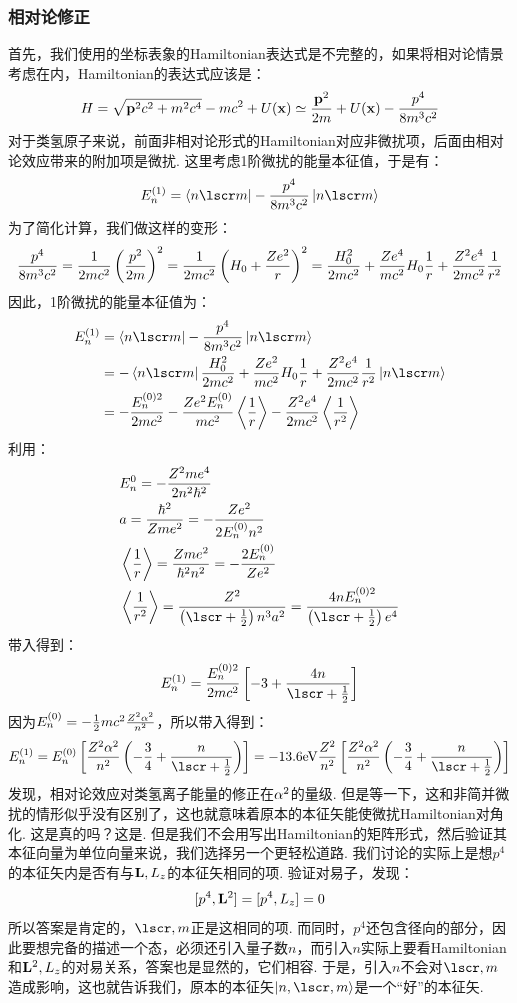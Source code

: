 \subsubsection{相对论修正}
首先，我们使用的坐标表象的Hamiltonian表达式是不完整的，如果将相对论情景考虑在内，Hamiltonian的表达式应该是：
\[
H = \sqrt{\mathbf{p}^{2}c^{2} + m^{2}c^{4}} - mc^{2}  + U(\mathbf{x}) \simeq \frac{\mathbf{p}^2}{2m} + U(\mathbf{x}) - \frac{p^{4}}{8m^{3}c^{2}}
\]
对于类氢原子来说，前面非相对论形式的Hamiltonian对应非微扰项，后面由相对论效应带来的附加项是微扰. 这里考虑1阶微扰的能量本征值，于是有：
\[
E_{n}^{(1)} = \bra{n\lscr m}- \frac{p^{4}}{8m^{3}c^{2}}\ket{n\lscr m}
\]
为了简化计算，我们做这样的变形：
\[
\frac{p^{4}}{8m^{3}c^{2}} = \frac{1}{2mc^{2}}\left({\frac{p^{2}}{2m}}\right)^{2} = \frac{1}{2mc^{2}}\left({H_{0} + \frac{Ze^{2}}{r}}\right)^{2} = \frac{H_{0}^{2}}{2mc^{2}} + \frac{Ze^{4}}{mc^{2}}H_{0}\frac{1}{r} + \frac{Z^{2}e^{4}}{2mc^{2}}\frac{1}{r^{2}}
\]
因此，1阶微扰的能量本征值为：
\begin{align*}
E_{n}^{(1)}
& = \bra{n\lscr m}- \frac{p^{4}}{8m^{3}c^{2}}\ket{n\lscr m} \\
& = -\bra{n\lscr m}\frac{H_{0}^{2}}{2mc^{2}} + \frac{Ze^{2}}{mc^{2}}H_{0}\frac{1}{r} + \frac{Z^{2}e^{4}}{2mc^{2}}\frac{1}{r^{2}}\ket{n\lscr m} \\
& = - \frac{E_{n}^{(0)2}}{2mc^{2}} - \frac{Ze^{2}E_{n}^{(0)}}{mc^{2}}\avg{\frac{1}{r}} - \frac{Z^{2}e^{4}}{2mc^{2}}\avg{\frac{1}{r^{2}}} \\
\end{align*}
利用：
\begin{align*}
& E_{n}^{0} = -\frac{Z^{2}me^{4}}{2n^{2}\hh^{2}} \\
& a = \frac{\hh^{2}}{Zme^{2}} = -\frac{Ze^{2}}{2E_{n}^{(0)}n^{2}} \\
& \avg{\frac{1}{r}} = \frac{Zme^{2}}{\hh^{2}n^{2}} = -\frac{2E_{n}^{(0)}}{Ze^{2}} \\
& \avg{\frac{1}{r^{2}}}= \frac{Z^{2}}{\br{\lscr+\frac{1}{2}}n^{3}a^{2}} = \frac{4nE_{n}^{(0)2}}{\br{\lscr+\frac{1}{2}}e^{4}} \\
\end{align*}
带入得到：
\[
E_{n}^{(1)} = \frac{E_{n}^{(0)2}}{2mc^{2}}\mbr{-3 + \frac{4n}{\lscr+\frac{1}{2}}}
\]
因为\(E_{n}^{(0)} = -\frac{1}{2}mc^{2}\frac{Z^{2}\alpha^{2}}{n^{2}}\)，所以带入得到：
\[
E_{n}^{(1)} = E_{n}^{(0)}\mbr{\frac{Z^{2}\al^{2}}{n^{2}}\br{-\frac{3}{4} + \frac{n}{\lscr+\frac{1}{2}}}} = -13.6\mathrm{eV}\frac{Z^{2}}{n^{2}}\mbr{\frac{Z^{2}\al^{2}}{n^{2}}\br{-\frac{3}{4} + \frac{n}{\lscr+\frac{1}{2}}}}
\]
发现，相对论效应对类氢离子能量的修正在\(\alpha^{2}\)的量级. 但是等一下，这和非简并微扰的情形似乎没有区别了，这也就意味着原本的本征矢能使微扰Hamiltonian对角化. 这是真的吗？这是. 但是我们不会用写出Hamiltonian的矩阵形式，然后验证其本征向量为单位向量来说，我们选择另一个更轻松道路. 我们讨论的实际上是想\(p^{4}\)的本征矢内是否有与\(\mathbf{L},L_{z}\)的本征矢相同的项. 验证对易子，发现：
\[
[p^{4},\mathbf{L}^{2}] = [p^{4},L_{z}] = 0
\]
所以答案是肯定的，\(\lscr,m\)正是这相同的项. 而同时，\(p^{4}\)还包含径向的部分，因此要想完备的描述一个态，必须还引入量子数\(n\)，而引入\(n\)实际上要看Hamiltonian和\(\mathbf{L}^{2},L_{z}\)的对易关系，答案也是显然的，它们相容. 于是，引入\(n\)不会对\(\lscr,m\)造成影响，这也就告诉我们，原本的本征矢\(\ket{n,\lscr,m}\)是一个“好”的本征矢. 
